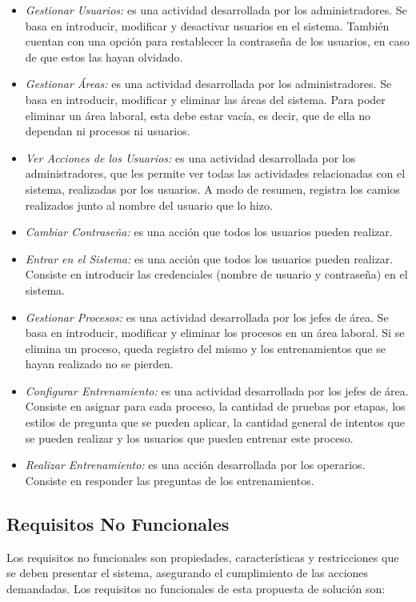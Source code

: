 \begin{itemize}
\item \textsl{Gestionar Usuarios:} es una actividad desarrollada por los administradores. Se basa en introducir, modificar y desactivar usuarios en el sistema. También cuentan con una opción para restablecer la contraseña de los usuarios, en caso de que estos las hayan olvidado.
\item \textsl{Gestionar Áreas:}  es una actividad desarrollada por los administradores. Se basa en introducir, modificar y eliminar las áreas del sistema. Para poder eliminar un área laboral, esta debe estar vacía, es decir, que de ella no dependan ni procesos ni usuarios.
\item \textsl{Ver Acciones de los Usuarios:}  es una actividad desarrollada por los administradores, que les permite ver todas las actividades relacionadas con el sistema, realizadas por los usuarios. A modo de resumen, registra los camios realizados junto al nombre del usuario que lo hizo.
\item \textsl{Cambiar Contraseña:} es una acción que todos los usuarios pueden realizar.
\item \textsl{Entrar en el Sistema:} es una acción que todos los usuarios pueden realizar. Consiste en introducir las credenciales (nombre de usuario y contraseña) en el sistema.
\item \textsl{Gestionar Procesos:} es una actividad desarrollada por los jefes de área. Se basa en introducir, modificar y eliminar los procesos en un área laboral. Si se elimina un proceso, queda registro del mismo y los entrenamientos que se hayan realizado no se pierden.
\item \textsl{Configurar Entrenamiento:}  es una actividad desarrollada por los jefes de área. Consiste en asignar para cada proceso, la cantidad de pruebas por etapas, los estilos de pregunta que se pueden aplicar, la cantidad general de intentos que se pueden realizar y los usuarios que pueden entrenar este proceso.
\item \textsl{Realizar Entrenamiento:} es una acción desarrollada por los operarios. Consiste en responder las preguntas de los entrenamientos.
\end{itemize}

\subsection{Requisitos No Funcionales}
Los requisitos no funcionales son propiedades, características y restricciones que se deben presentar el sistema, asegurando el cumplimiento de las acciones demandadas. Los requisitos no funcionales de esta propuesta de solución son:

